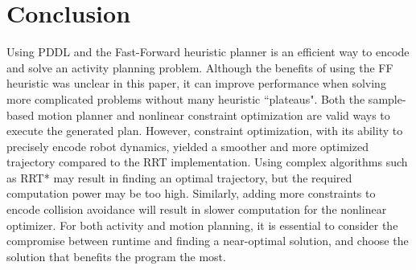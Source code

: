 \documentclass{article}
\begin{document}
\section{Conclusion}

Using PDDL and the Fast-Forward heuristic planner is an efficient way to encode and solve an activity planning problem. Although the benefits of using the FF heuristic was unclear in this paper, it can improve performance when solving more complicated problems without many heuristic ``plateaus". Both the sample-based motion planner and nonlinear constraint optimization are valid ways to execute the generated plan. However, constraint optimization, with its ability to precisely encode robot dynamics, yielded a smoother and more optimized trajectory compared to the RRT implementation. Using complex algorithms such as RRT* may result in finding an optimal trajectory, but the required computation power may be too high. Similarly, adding more constraints to encode collision avoidance will result in slower computation for the nonlinear optimizer. For both activity and motion planning, it is essential to consider the compromise between runtime and finding a near-optimal solution, and choose the solution that benefits the program the most.

\printbibliography
\end{document}
